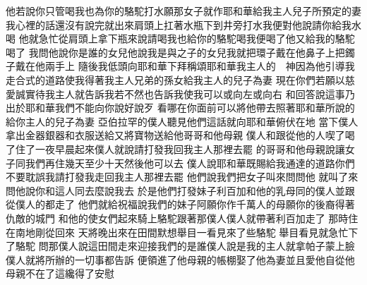 他若說\chientien 你只管喝\chientien 我也為你的駱駝打水\yuentien 願那女子就作耶和華給我主人兒子所預定的妻\chuan 
{}我心裡的話還沒有說完\chientien{}就出來\chientien 肩頭上扛著水瓶\chientien 下到井旁打水\yuentien 我便對他說\chientien 請你給我水喝\chuan 
{}他就急忙從肩頭上拿下瓶來\chientien 說\chientien 請喝\chientien 我也給你的駱駝喝\yuentien 我便喝了\yuentien 他又給我的駱駝喝了\chuan 
{}我問他說\chientien 你是誰的女兒\chientien 他說\chientien 我是與之子的女兒\chientien 我就把環子戴在他鼻子上\chientien 把鐲子戴在他兩手上\chuan 
{}隨後我低頭向耶和華下拜\chientien 稱頌耶和華我主人的　神\chientien 因為他引導我走合式的道路\chientien 使我得著我主人兄弟的孫女\chientien 給我主人的兒子為妻\chuan 
{}現在你們若願以慈愛誠實待我主人\chientien 就告訴我\yuentien 若不然\chientien 也告訴我\chientien 使我可以或向左\chientien 或向右\chuan\Chuan
{}和回答說\chientien 這事乃出於耶和華\chientien 我們不能向你說好說歹\chuan 
{}看哪\chientien{}在你面前\chientien 可以將他帶去\chientien 照著耶和華所說的\chientien 給你主人的兒子為妻\chuan 
{}亞伯拉罕的僕人聽見他們這話\chientien 就向耶和華俯伏在地\chuan 
{}當下僕人拿出金器\chientien 銀器\chientien 和衣服送給\chientien 又將寶物送給他哥哥\chientien 和他母親\chuan 
{}僕人和跟從他的人\chientien 喫了喝了\chientien 住了一夜\chientien 早晨起來\chientien 僕人就說\chientien 請打發我回我主人那裡去罷\chuan 
{}的哥哥和他母親說\chientien 讓女子同我們再住幾天\chientien 至少十天\chientien 然後他可以去\chuan 
{}僕人說\chientien 耶和華既賜給我通達的道路\chientien 你們不要耽誤我\chientien 請打發我走\chientien 回我主人那裡去罷\chuan 
{}他們說\chientien 我們把女子叫來問問他\chientien 
{}就叫了來\chientien 問他說\chientien 你和這人同去麼\chientien{}說\chientien 我去\chuan 
{}於是他們打發妹子利百加和他的乳母\chientien 同的僕人\chientien 並跟從僕人的\chientien 都走了\chuan 
{}他們就給祝福\chientien 說\chientien 我們的妹子阿\chientien 願你作千萬人的母\chientien 願你的後裔\chientien 得著仇敵的城門\chuan 
{}和他的使女們起來\chientien 騎上駱駝\chientien 跟著那僕人\yuentien 僕人就帶著利百加走了\chuan 
{}那時\chientien{}住在南地\chientien 剛從回來\chuan 
{}天將晚\chientien{}出來在田間默想\yuentien 舉目一看\chientien 見來了些駱駝\chuan 
{}舉目看見\chientien 就急忙下了駱駝\yuentien 
{}問那僕人說\chientien 這田間走來迎接我們的是誰\chientien 僕人說\chientien 是我的主人\yuentien{}就拿帕子蒙上臉\chuan 
{}僕人就將所辦的一切事\chientien 都告訴\chuan 
{}便領進了他母親的帳棚\chientien 娶了他為妻\yuentien 並且愛他\chuan{}自從他母親不在了\chientien 這纔得了安慰\chuan
